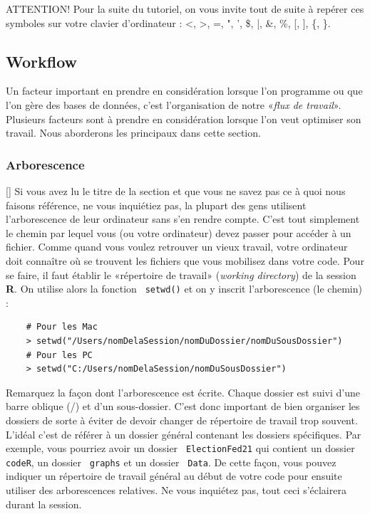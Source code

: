 \documentclass[10.5pt,a4paper]{article}
\newcommand{\rcode}[1]{\texttt{\color{rstudio} #1}}
\begin{document}
ATTENTION! Pour la suite du tutoriel, on vous invite tout de suite à repérer ces symboles sur votre clavier d'ordinateur : <, >, =, ", ', \$, |, \&, \%, [, ], \{, \}.

  \subsection{Workflow}
  
  Un facteur important en prendre en considération lorsque l'on programme ou que l'on gère des bases de données, c'est l'organisation de notre «\emph{flux de travail}». Plusieurs facteurs sont à prendre en considération lorsque l'on veut optimiser son travail. Nous aborderons les principaux dans cette section.
  
    \subsubsection{Arborescence}[\label{arborescence}]
    Si vous avez lu le titre de la section et que vous ne savez pas ce à quoi nous faisons référence, ne vous inquiétiez pas, la plupart des gens utilisent l'arborescence de leur ordinateur sans s'en rendre compte. C'est tout simplement le chemin par lequel vous (ou votre ordinateur) devez passer pour accéder à un fichier. Comme quand vous voulez retrouver un vieux travail, votre ordinateur doit connaître où se trouvent les fichiers que vous mobilisez dans votre code. Pour se faire, il faut établir le «répertoire de travail» (\emph{working directory}) de la session \textbf{R}. On utilise alors la fonction \rcode{setwd()} et on y inscrit l'arborescence (le chemin) :
    
    \begin{lstlisting}
    # Pour les Mac
    > setwd("/Users/nomDelaSession/nomDuDossier/nomDuSousDossier")
    # Pour les PC
    > setwd("C:/Users/nomDelaSession/nomDuSousDossier")
    \end{lstlisting}
    
    Remarquez la façon dont l'arborescence est écrite. Chaque dossier est suivi d'une barre oblique (/) et d'un sous-dossier. C'est donc important de bien organiser les dossiers de sorte à éviter de devoir changer de répertoire de travail trop souvent. L'idéal c'est de référer à un dossier général contenant les dossiers spécifiques. Par exemple, vous pourriez avoir un dossier \rcode{ElectionFed21} qui contient un dossier \rcode{codeR}, un dossier \rcode{graphs} et un dossier \rcode{Data}. De cette façon, vous pouvez indiquer un répertoire de travail général au début de votre code pour ensuite utiliser des arborescences relatives. Ne vous inquiétez pas, tout ceci s'éclairera durant la session.
    
\end{document}
